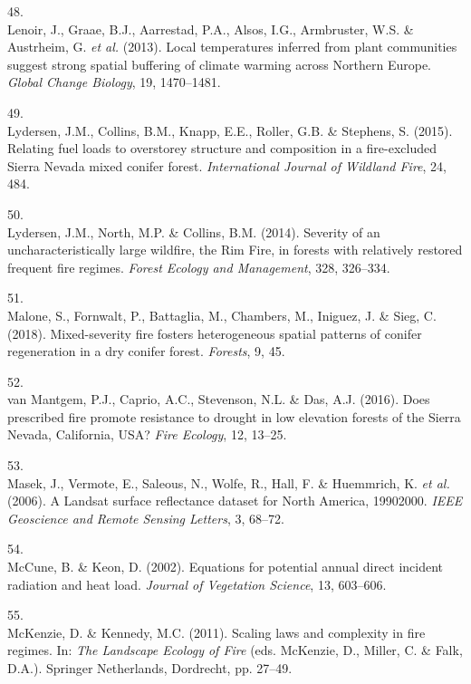 \documentclass[]{article}
\begin{document}
\leavevmode\hypertarget{ref-lenoir2013}{}%
48.\\
Lenoir, J., Graae, B.J., Aarrestad, P.A., Alsos, I.G., Armbruster, W.S.
\& Austrheim, G. \emph{et al.} (2013). Local temperatures inferred from
plant communities suggest strong spatial buffering of climate warming
across Northern Europe. \emph{Global Change Biology}, 19, 1470--1481.

\leavevmode\hypertarget{ref-lydersen2015}{}%
49.\\
Lydersen, J.M., Collins, B.M., Knapp, E.E., Roller, G.B. \& Stephens, S.
(2015). Relating fuel loads to overstorey structure and composition in a
fire-excluded Sierra Nevada mixed conifer forest. \emph{International
Journal of Wildland Fire}, 24, 484.

\leavevmode\hypertarget{ref-lydersen2014}{}%
50.\\
Lydersen, J.M., North, M.P. \& Collins, B.M. (2014). Severity of an
uncharacteristically large wildfire, the Rim Fire, in forests with
relatively restored frequent fire regimes. \emph{Forest Ecology and
Management}, 328, 326--334.

\leavevmode\hypertarget{ref-malone2018}{}%
51.\\
Malone, S., Fornwalt, P., Battaglia, M., Chambers, M., Iniguez, J. \&
Sieg, C. (2018). Mixed-severity fire fosters heterogeneous spatial
patterns of conifer regeneration in a dry conifer forest.
\emph{Forests}, 9, 45.

\leavevmode\hypertarget{ref-vanmantgem2016}{}%
52.\\
van Mantgem, P.J., Caprio, A.C., Stevenson, N.L. \& Das, A.J. (2016).
Does prescribed fire promote resistance to drought in low elevation
forests of the Sierra Nevada, California, USA? \emph{Fire Ecology}, 12,
13--25.

\leavevmode\hypertarget{ref-masek2006}{}%
53.\\
Masek, J., Vermote, E., Saleous, N., Wolfe, R., Hall, F. \& Huemmrich,
K. \emph{et al.} (2006). A Landsat surface reflectance dataset for North
America, 19902000. \emph{IEEE Geoscience and Remote Sensing Letters}, 3,
68--72.

\leavevmode\hypertarget{ref-mccune2002}{}%
54.\\
McCune, B. \& Keon, D. (2002). Equations for potential annual direct
incident radiation and heat load. \emph{Journal of Vegetation Science},
13, 603--606.

\leavevmode\hypertarget{ref-mckenzie2011}{}%
55.\\
McKenzie, D. \& Kennedy, M.C. (2011). Scaling laws and complexity in
fire regimes. In: \emph{The Landscape Ecology of Fire} (eds. McKenzie,
D., Miller, C. \& Falk, D.A.). Springer Netherlands, Dordrecht, pp.
27--49.
\end{document}
